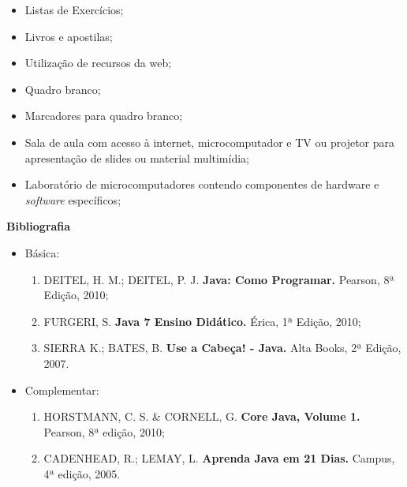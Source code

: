 \begin{itemize} 
  	  \item Listas de Exercícios;
  	  \item Livros e apostilas;
  	  \item Utilização de recursos da web;
  	  \item Quadro branco;
  	  \item Marcadores para quadro branco;
  	  \item Sala de aula com acesso à internet, microcomputador e TV ou projetor para apresentação de slides ou material multimídia;
  	  \item Laboratório de microcomputadores contendo componentes de hardware e \textit{software} específicos;
\end{itemize}


\begin{snugshade}\begin{center}\textbf{
    Bibliografia
}\end{center}\end{snugshade}

\begin{itemize} 
  \item Básica:
	\begin{enumerate}
	\item DEITEL, H. M.; DEITEL, P. J. \textbf{Java: Como Programar.} Pearson, 8ª Edição, 2010;
	\item FURGERI, S. \textbf{Java 7 Ensino Didático.} Érica, 1ª Edição, 2010;
	\item SIERRA K.; BATES, B. \textbf{Use a Cabeça! - Java.} Alta Books, 2ª Edição, 2007.
	\end{enumerate}
  \item Complementar:
	\begin{enumerate} 
	\item HORSTMANN, C. S. \& CORNELL, G. \textbf{Core Java, Volume 1.} Pearson, 8ª edição, 2010;
	\item CADENHEAD, R.; LEMAY, L. \textbf{Aprenda Java em 21 Dias.} Campus, 4ª edição, 2005.
	\end{enumerate}
\end{itemize}

